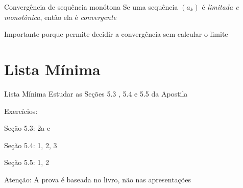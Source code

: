 \documentclass[fleqn,utf8,aspectratio=169,12pt]{beamer}
\begin{document}
\begin{frame}{Convergência de sequência monótona}
	Se uma sequência $(a_k)$ é \emph{limitada e monotônica},
  então ela é \emph{convergente}

	\pause
	\vspace{2\baselineskip}
	Importante porque permite decidir a convergência sem calcular o limite
\end{frame}

\section{Lista Mínima}

\begin{frame}{Lista Mínima}
  Estudar as Seções 5.3 , 5.4 e 5.5 da Apostila

  \vfill
  Exercícios:

  \quad Seção 5.3: 2a-c

  \quad Seção 5.4: 1, 2, 3

  \quad Seção 5.5: 1, 2

  \vfill
  Atenção: A prova é baseada no livro, não nas apresentações
\end{frame}

\end{document}
